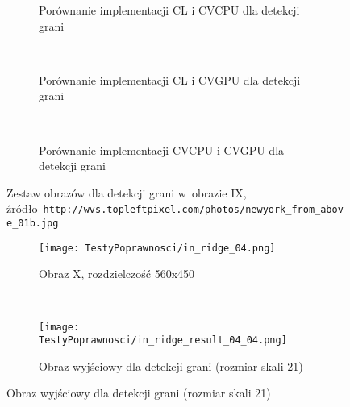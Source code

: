 \begin{itemize}
\begin{figure}[H]
\begin{subfigure}[t]{0.3\textwidth}
	\centering
	\setlength\fboxsep{0pt}
	\setlength\fboxrule{0.5pt}
	\caption{Porównanie implementacji CL i CVCPU dla detekcji grani}
	\label{fig:valRidge1CLCVCPU}
\end{subfigure}
~
\begin{subfigure}[t]{0.3\textwidth}
	\centering
	\setlength\fboxsep{0pt}
	\setlength\fboxrule{0.5pt}
	\caption{Porównanie implementacji CL i CVGPU dla detekcji grani}
	\label{fig:valRidge1CLCVGPU}
\end{subfigure}
~
\begin{subfigure}[t]{0.3\textwidth}
	\centering
	\setlength\fboxsep{0pt}
	\setlength\fboxrule{0.5pt}
	\caption{Porównanie implementacji CVCPU i CVGPU dla detekcji grani}
	\label{fig:valRidge1CVCPUCVGPU}                 
\end{subfigure}
\caption{Zestaw obrazów dla detekcji grani w~obrazie IX, \tiny{źródło~\texttt{http://wvs.topleftpixel.com/photos/newyork\_from\_above\_01b.jpg}}}

\label{fig:valRidge1}
\end{figure}

\begin{figure}[H]

\begin{center}
\begin{subfigure}[t]{0.3\textwidth}
\texttt{[image: TestyPoprawnosci/in\_ridge\_04.png]}
\caption{Obraz X, rozdzielczość 560x450}
\label{fig:valRidge04}
\end{subfigure}
~
\begin{subfigure}[t]{0.3\textwidth}
\texttt{[image: TestyPoprawnosci/in\_ridge\_result\_04\_04.png]}
\caption{Obraz wyjściowy dla detekcji grani (rozmiar skali 21)}
\label{fig:valRidgeResult04}
\end{subfigure}
\end{center}


\end{figure}
\end{itemize}

